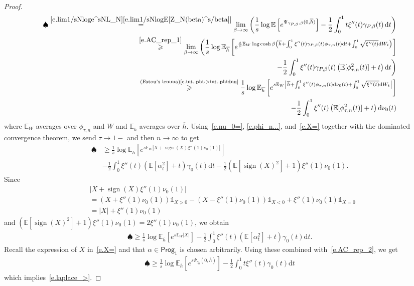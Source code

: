 \documentclass[10pt,a4paper]{amsart}
\newcommand{\E}{\mathbb{E}}
\newcommand{\Ll}{\left}
\newcommand{\Rr}{\right}
\renewcommand{\bar}{\overline}
\renewcommand{\d}{\mathrm{d}}
\renewcommand{\geq}{\geqslant}
\newcommand{\prog}{\mathsf{Prog}}
\DeclareMathOperator{\sign}{sign}
\begin{document}
\begin{proof}
\begin{align*}
    \spadesuit\stackrel{\eqref{e.lim1/sNloge^sNL_N}\eqref{e.lim1/sNlogE[Z_N(beta)^s/beta]}}{=}\lim_{\beta\to\infty} \bigg( \frac{1}{s}\log\E\Ll[e^{\Psi_{\gamma_{P,\beta},\beta}(0,\bar h)}\Rr] - \frac{1}{2} \int_0^1 t \xi''(t) \gamma_{P,\beta}(t) \, \d t \bigg)
    \\
    \stackrel{\eqref{e.AC_rep_1}}{\geq}\lim_{\beta\to\infty}\bigg(\frac{1}{s}\log\E_{\bar h}\Ll[e^{\frac{s}{\beta}\E_{W}\log\cosh \beta\Ll( \bar h + \int_0^1\xi''(t)\gamma_{P,\beta}(t)\phi_{\tau,n}(t)\d t +\int_0^1\sqrt{\xi''(t)}\d W_t\Rr)}\Rr]
    \\
    -\frac{1}{2}\int_0^1 \xi''(t)\gamma_{P,\beta}(t)\Ll(\E[\phi_{\tau,n}^2(t)]+t\Rr)\d t\bigg)
    \\
    \stackrel{\text{(Fatou's lemma)\eqref{e.int..phi->int..phidnu}}}{\geq} \frac{1}{s}\log\E_{\bar h}\Ll[e^{s\E_W\Ll| \bar h + \int_0^1\xi''(t)\phi_{\tau,n}(t)\d\nu_0(t) +\int_0^1\sqrt{\xi''(t)}\d W_t\Rr|}\Rr]
    \\
    -\frac{1}{2}\int_0^1 \xi''(t)\Ll(\E[\phi_{\tau,n}^2(t)]+t\Rr)\d \nu_0(t)
\end{align*}
where $\E_W$ averages over $\phi_{\tau,n}$ and $W$ and $\E_{\bar h}$ averages over $\bar h$.
Using~\eqref{e.nu_0=}, \eqref{e.phi_n...}, and~\eqref{e.X=} together with the dominated convergence theorem, we send $\tau\to1-$ and then $n\to\infty$ to get
\begin{align*}
    \spadesuit & \geq \frac{1}{s}\log\E_{\bar h}\Ll[e^{s\E_W\Ll|X + \sign(X)\xi''(1)\nu_0(1)\Rr|}\Rr]
    \\
    &-\frac{1}{2}\int_0^1 \xi''(t)\Ll(\E[\alpha^2_t]+t\Rr)\gamma_0(t)\d t - \frac{1}{2}\Ll(\E\Ll[\sign(X)^2\Rr]+1\Rr)\xi''(1)\nu_0(1).
\end{align*}
Since
\begin{align*}
    &\Ll|X+\sign(X)\xi''(1)\nu_0(1)\Rr|
    \\
    &=\Ll(X+\xi''(1)\nu_0(1)\Rr)\mathds{1}_{X>0}- \Ll(X-\xi''(1)\nu_0(1)\Rr)\mathds{1}_{X<0}+\xi''(1)\nu_0(1)\mathds{1}_{X=0}
    \\
    & =|X|+\xi''(1)\nu_0(1)
\end{align*}
and $\Ll(\E\Ll[\sign(X)^2\Rr]+1\Rr)\xi''(1)\nu_0(1)=2\xi''(1)\nu_0(1)$, we obtain
\begin{align*}
    \spadesuit \geq \frac{1}{s}\log\E_{\bar h}\Ll[e^{s\E_W\Ll|X\Rr|}\Rr]
    -\frac{1}{2}\int_0^1 \xi''(t)\Ll(\E[\alpha^2_t]+t\Rr)\gamma_0(t)\d t .
\end{align*}
Recall the expression of $X$ in~\eqref{e.X=} and that $\alpha\in\prog_1$ is chosen arbitrarily. Using these combined with~\eqref{e.AC_rep_2}, we get
\begin{align*}
    \spadesuit \geq \frac{1}{s}\log\E_{\bar h}\Ll[e^{s\Psi_{\gamma_0}(0,\bar h)}\Rr]
    -\frac{1}{2}\int_0^1 t\xi''(t)\gamma_0(t)\d t
\end{align*}
which implies~\eqref{e.laplace_>}.
\end{proof}
\end{document}
